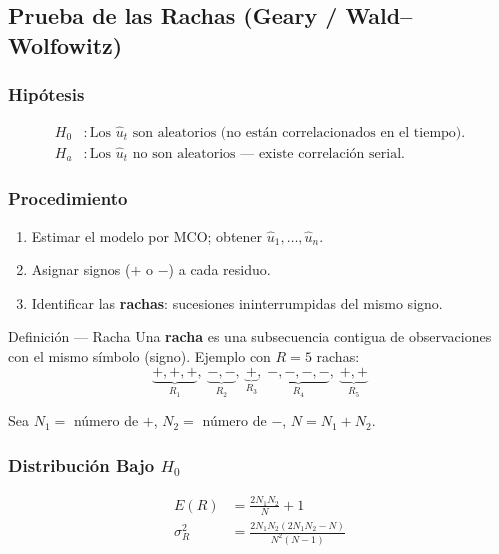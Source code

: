 \documentclass[11pt, letterpaper]{article}
\begin{document}
\subsection{Prueba de las Rachas (Geary / Wald--Wolfowitz)}

\subsubsection{Hip\'otesis}
\begin{align*}
  H_0 &: \text{Los } \hat{u}_t \text{ son aleatorios (no est\'an
          correlacionados en el tiempo).}\\
  H_a &: \text{Los } \hat{u}_t \text{ no son aleatorios ---
          existe correlaci\'on serial.}
\end{align*}

\subsubsection{Procedimiento}
\begin{enumerate}
  \item Estimar el modelo por MCO; obtener $\hat{u}_1,\ldots,\hat{u}_n$.
  \item Asignar signos ($+$ o $-$) a cada residuo.
  \item Identificar las \textbf{rachas}: sucesiones ininterrumpidas del
    mismo signo.
\end{enumerate}

\begin{definicion}{Definici\'on --- Racha}
Una \textbf{racha} es una subsecuencia contigua de observaciones con el mismo
s\'imbolo (signo). Ejemplo con $R=5$ rachas:
\[
  \underbrace{+,+,+}_{R_1},\;
  \underbrace{-,-}_{R_2},\;
  \underbrace{+}_{R_3},\;
  \underbrace{-,-,-,-}_{R_4},\;
  \underbrace{+,+}_{R_5}
\]
\end{definicion}

\noindent Sea $N_1=$ n\'umero de $+$, $N_2=$ n\'umero de $-$, $N=N_1+N_2$.

\subsubsection{Distribuci\'on Bajo $H_0$}

\begin{align}
  E(R) &= \frac{2 N_1 N_2}{N} + 1 \label{eq:Emean}\\[6pt]
  \sigma_R^2 &= \frac{2 N_1 N_2 (2 N_1 N_2 - N)}{N^2 (N-1)}
  \label{eq:Rvar}
\end{align}
\end{document}

